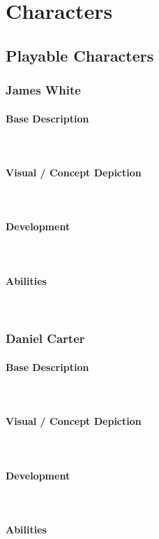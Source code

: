 \section{Characters}
    \subsection{Playable Characters}
        \subsubsection{James White}
            \paragraph{Base Description}\mbox{}\\
            \paragraph{Visual / Concept Depiction}\mbox{}\\
            \paragraph{Development}\mbox{}\\
            \paragraph{Abilities}\mbox{}\\
        \subsubsection{Daniel Carter}
            \paragraph{Base Description}\mbox{}\\
            \paragraph{Visual / Concept Depiction}\mbox{}\\
            \paragraph{Development}\mbox{}\\
            \paragraph{Abilities}\mbox{}\\
